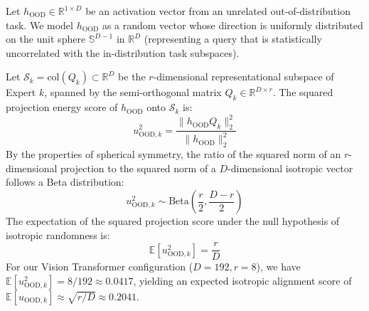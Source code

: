 Let $h_{\text{OOD}} \in \mathbb{R}^{1 \times D}$ be an activation vector from an unrelated out-of-distribution task. We model $h_{\text{OOD}}$ as a random vector whose direction is uniformly distributed on the unit sphere $\mathbb{S}^{D-1}$ in $\mathbb{R}^D$ (representing a query that is statistically uncorrelated with the in-distribution task subspaces). 

Let $\mathcal{S}_k = \text{col}(Q_k) \subset \mathbb{R}^D$ be the $r$-dimensional representational subspace of Expert $k$, spanned by the semi-orthogonal matrix $Q_k \in \mathbb{R}^{D \times r}$. The squared projection energy score of $h_{\text{OOD}}$ onto $\mathcal{S}_k$ is:
\begin{equation}
    u_{\text{OOD}, k}^2 = \frac{\parallel h_{\text{OOD}} Q_k \parallel_2^2}{\parallel h_{\text{OOD}} \parallel_2^2}
\end{equation}
By the properties of spherical symmetry, the ratio of the squared norm of an $r$-dimensional projection to the squared norm of a $D$-dimensional isotropic vector follows a Beta distribution:
\begin{equation}
    u_{\text{OOD}, k}^2 \sim \text{Beta}\left(\frac{r}{2}, \frac{D-r}{2}\right)
\end{equation}
The expectation of the squared projection score under the null hypothesis of isotropic randomness is:
\begin{equation}
    \mathbb{E}[u_{\text{OOD}, k}^2] = \frac{r}{D}
\end{equation}
For our Vision Transformer configuration ($D=192, r=8$), we have $\mathbb{E}[u_{\text{OOD}, k}^2] = 8/192 \approx 0.0417$, yielding an expected isotropic alignment score of $\mathbb{E}[u_{\text{OOD}, k}] \approx \sqrt{r/D} \approx 0.2041$.

